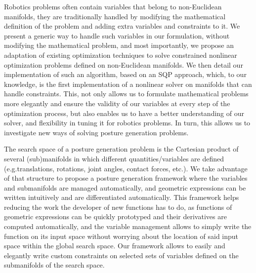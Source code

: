 Robotics problems often contain variables that belong to non-Euclidean manifolds, they are traditionally handled by modifying the mathematical definition of the problem and adding extra variables and constraints to it.
We present a generic way to handle such variables in our formulation, without modifying the mathematical problem, and most importantly, we propose an adaptation of existing optimization techniques to solve constrained nonlinear optimization problems defined on non-Euclidean manifolds.
We then detail our implementation of such an algorithm, based on an SQP approach, which, to our knowledge, is the first implementation of a nonlinear solver on manifolds that can handle constraints.
This, not only allows us to formulate mathematical problems more elegantly and ensure the validity of our variables at every step of the optimization process, but also enables us to have a better understanding of our solver, and flexibility in tuning it for robotics problems.
In turn, this allows us to investigate new ways of solving posture generation problems.

The search space of a posture generation problem is the Cartesian product of several (sub)manifolds in which different quantities/variables are defined (e.g.translations, rotations, joint angles, contact forces, etc.).
We take advantage of that structure to propose a posture generation framework where the variables and submanifolds are managed automatically, and geometric expressions can be written intuitively and are differentiated automatically.
This framework helps reducing the work the developer of new functions has to do, as functions of geometric expressions can be quickly prototyped and their derivatives are computed automatically, and the variable management allows to simply write the function on its input space without worrying about the location of said input space within the global search space.
Our framework allows to easily and elegantly write custom constraints on selected sets of variables defined on the submanifolds of the search space.

